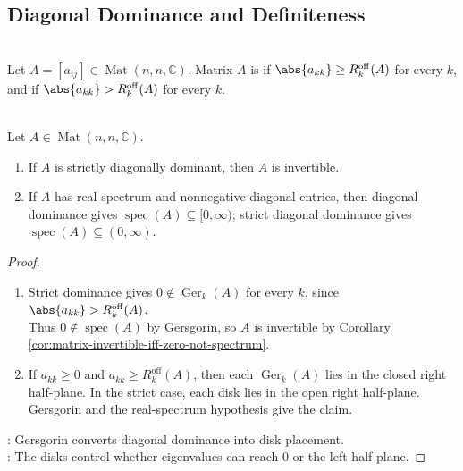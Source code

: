 \subsection{Diagonal Dominance and Definiteness}

\begin{definition} \label{def:diagonal-dominance} \\
Let $A=[a_{ij}]\in\operatorname{Mat}(n,n,\mathbb{C})$. Matrix $A$ is  if $\abs{a_{kk}}\geq R_k^{\mathrm{off}}(A)$ for every $k$, and  if $\abs{a_{kk}}>R_k^{\mathrm{off}}(A)$ for every $k$.
\end{definition}

\begin{corollary} \label{cor:strict-diagonal-dominance-invertible} \\
Let $A\in\operatorname{Mat}(n,n,\mathbb{C})$.
\begin{enumerate}[label=(\roman*)]
\setlength{\itemsep}{0pt}
\item If $A$ is strictly diagonally dominant, then $A$ is invertible.
\item If $A$ has real spectrum and nonnegative diagonal entries, then diagonal dominance gives $\operatorname{spec}(A)\subseteq[0,\infty)$; strict diagonal dominance gives $\operatorname{spec}(A)\subseteq(0,\infty)$.
\end{enumerate}
\begin{proof}
\begin{enumerate}[label=(\roman*)]
\setlength{\itemsep}{0pt}
\item Strict dominance gives $0\notin \operatorname{Ger}_k(A)$ for every $k$, since $\abs{a_{kk}}>R_k^{\mathrm{off}}(A)$.\\
Thus $0\notin\operatorname{spec}(A)$ by Gersgorin, so $A$ is invertible by Corollary \ref{cor:matrix-invertible-iff-zero-not-spectrum}.
\item If $a_{kk}\geq0$ and $a_{kk}\geq R_k^{\mathrm{off}}(A)$, then each $\operatorname{Ger}_k(A)$ lies in the closed right half-plane. In the strict case, each disk lies in the open right half-plane. Gersgorin and the real-spectrum hypothesis give the claim.
\end{enumerate}
: Gersgorin converts diagonal dominance into disk placement.\\
: The disks control whether eigenvalues can reach $0$ or the left half-plane.
\end{proof}
\end{corollary}

